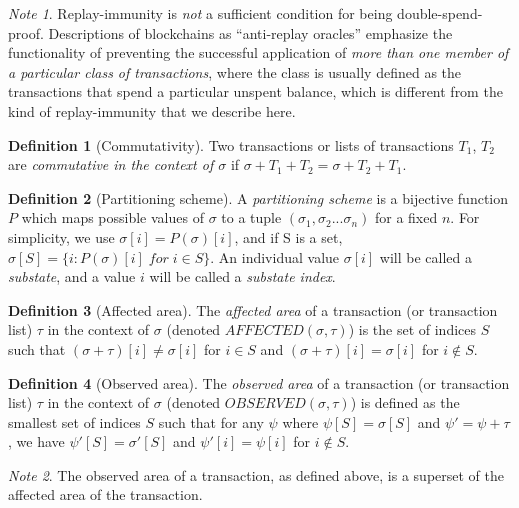 \documentclass[11pt,a4paper]{report}
\theoremstyle{plain}
\theoremstyle{definition}
\newtheorem{defn}{Definition}[chapter]
\theoremstyle{remark}
\newtheorem*{note}{Note}
\begin{document}
\begin{note}
Replay-immunity is \emph{not} a sufficient condition for being double-spend-proof. Descriptions of blockchains as ``anti-replay oracles'' \citep{maxwell_really_2013} emphasize the functionality of preventing the successful application of \emph{more than one member of a particular class of transactions}, where the class is usually defined as the transactions that spend a particular unspent balance, which is different from the kind of replay-immunity that we describe here.
\end{note}

\begin{defn}[Commutativity]
Two transactions or lists of transactions $T_1$, $T_2$ are \emph{commutative in the context of $\sigma$} if $\sigma + T_1 + T_2 = \sigma + T_2 + T_1$.
\end{defn}

\begin{defn}[Partitioning scheme]
A \emph{partitioning scheme} is a bijective function $P$ which maps possible values of $\sigma$ to a tuple $(\sigma_1, \sigma_2 ... \sigma_n)$ for a fixed $n$. For simplicity, we use $\sigma[i] = P(\sigma)[i]$, and if S is a set, $\sigma[S] = \{i: P(\sigma)[i] \; for \; i \in S\}$. An individual value $\sigma[i]$ will be called a \emph{substate}, and a value $i$ will be called a \emph{substate index}.
\end{defn}

\begin{defn}[Affected area]
The \emph{affected area} of a transaction (or transaction list) $\tau$ in the context of $\sigma$ (denoted $AFFECTED(\sigma, \tau)$) is the set of indices $S$ such that $(\sigma + \tau)[i] \ne \sigma[i]$ for $i \in S$ and $(\sigma + \tau)[i] = \sigma[i]$ for $i \notin S$.
\end{defn}

\begin{defn}[Observed area]
The \emph{observed area} of a transaction (or transaction list) $\tau$ in the context of $\sigma$ (denoted $OBSERVED(\sigma, \tau)$) is defined as the smallest set of indices $S$ such that for any $\psi$ where $\psi[S] = \sigma[S]$ and $\psi' = \psi + \tau$, we have $\psi'[S] = \sigma'[S]$ and $\psi'[i] = \psi[i]$ for $i \notin S$. 
\end{defn}

\begin{note}
The observed area of a transaction, as defined above, is a superset of the affected area of the transaction.
\end{note}
\end{document}
